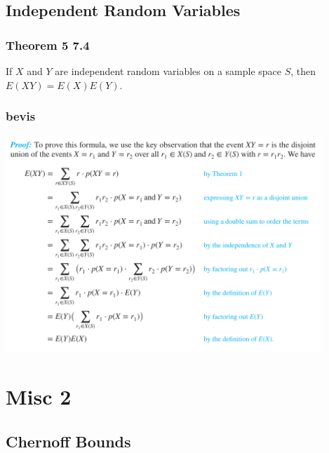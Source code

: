 \documentclass{beamer}
\begin{document}
\subsection{Independent Random Variables}

\begin{frame}[]
  \frametitle{Theorem 5 7.4}
  \begin{theorem}
    If \(X\) and \(Y\) are independent random variables on a sample space \(S\), then \(E(XY) = E(X)E(Y)\).
  \end{theorem} 
\end{frame}

\begin{frame}
  \frametitle{bevis}
 \includegraphics[width=340pt]{main--misc-1--linearity-of-expectation-7939.png} 
\end{frame}

\section{Misc 2}
\label{sec:label}



\subsection{Chernoff Bounds}
\label{subsec:label}
\end{document}
